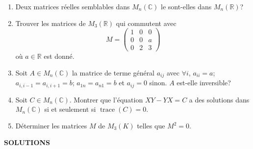 \begin{enumerate}[label=\arabic*.,leftmargin=2.2em,itemsep=1.1em]
\item Deux matrices réelles semblables dans $M_n(\mathbb C)$ le sont-elles dans $M_n(\mathbb R)$?

\item Trouver les matrices de $M_3(\mathbb R)$ qui commutent avec
\[
M=\begin{pmatrix}1&0&0\\0&0&a\\0&2&3\end{pmatrix}
\]
où $a\in\mathbb R$ est donné.

\item Soit $A\in M_n(\mathbb C)$ la matrice de terme général $a_{ij}$ avec $\forall i$, $a_{ii}=a$; $a_{i,i-1}=a_{i,i+1}=b$; $a_{1n}=a_{n1}=b$ et $a_{ij}=0$ sinon. $A$ est-elle inversible?

\item Soit $C\in M_n(\mathbb C)$. Montrer que l'équation $XY-YX=C$ a des solutions dans $M_n(\mathbb C)$ si et seulement si $\operatorname{trace}(C)=0$.

\item Déterminer les matrices $M$ de $M_3(K)$ telles que $M^2=0$.

\end{enumerate}

\begin{center}
{\Large\sffamily\bfseries\color{BellaLavenderDeep} SOLUTIONS}
\end{center}
\vspace{0.8em}

